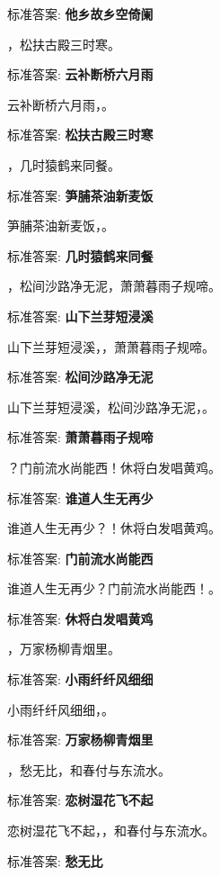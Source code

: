 \documentclass[12pt, a4paper, addpoints]{exam}
\begin{document}
\begin{questions}
标准答案: \textbf{他乡故乡空倚阑}

\question[1] \uline{\qquad\qquad\qquad}，松扶古殿三时寒。

标准答案: \textbf{云补断桥六月雨}

\question[1] 云补断桥六月雨，\uline{\qquad\qquad\qquad}。

标准答案: \textbf{松扶古殿三时寒}

\question[1] \uline{\qquad\qquad\qquad}，几时猿鹤来同餐。

标准答案: \textbf{笋脯茶油新麦饭}

\question[1] 笋脯茶油新麦饭，\uline{\qquad\qquad\qquad}。

标准答案: \textbf{几时猿鹤来同餐}

\question[1] \uline{\qquad\qquad\qquad}，松间沙路净无泥，萧萧暮雨子规啼。

标准答案: \textbf{山下兰芽短浸溪}

\question[1] 山下兰芽短浸溪，\uline{\qquad\qquad\qquad}，萧萧暮雨子规啼。

标准答案: \textbf{松间沙路净无泥}

\question[1] 山下兰芽短浸溪，松间沙路净无泥，\uline{\qquad\qquad\qquad}。

标准答案: \textbf{萧萧暮雨子规啼}

\question[1] \uline{\qquad\qquad\qquad}？门前流水尚能西！休将白发唱黄鸡。

标准答案: \textbf{谁道人生无再少}

\question[1] 谁道人生无再少？\uline{\qquad\qquad\qquad}！休将白发唱黄鸡。

标准答案: \textbf{门前流水尚能西}

\question[1] 谁道人生无再少？门前流水尚能西！\uline{\qquad\qquad\qquad}。

标准答案: \textbf{休将白发唱黄鸡}

\question[1] \uline{\qquad\qquad\qquad}，万家杨柳青烟里。

标准答案: \textbf{小雨纤纤风细细}

\question[1] 小雨纤纤风细细，\uline{\qquad\qquad\qquad}。

标准答案: \textbf{万家杨柳青烟里}

\question[1] \uline{\qquad\qquad\qquad}，愁无比，和春付与东流水。

标准答案: \textbf{恋树湿花飞不起}

\question[1] 恋树湿花飞不起，\uline{\qquad\qquad\qquad}，和春付与东流水。

标准答案: \textbf{愁无比}


\end{questions}
\end{document}
